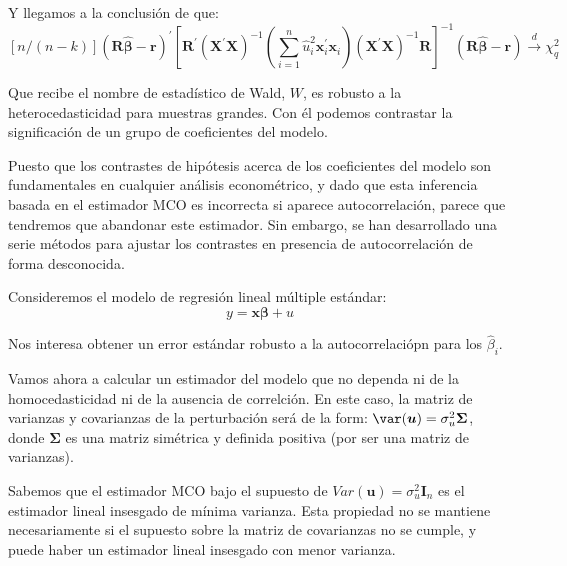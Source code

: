 Y llegamos a la conclusi\'on de que:
\[[n/(n-k)](\boldsymbol{R}\hat{\boldsymbol{\beta}}-\boldsymbol{r})^{\prime}\left[\boldsymbol{R}^{\prime}\left(\boldsymbol{X}^{\prime}\boldsymbol{X}\right)^{-1}\left(\sum_{i=1}^n\hat{u}_i^2\boldsymbol{x}_i^{\prime}\boldsymbol{x}_i\right)\left(\boldsymbol{X}^{\prime}\boldsymbol{X}\right)^{-1}\boldsymbol{R}\right]^{-1} (\boldsymbol{R}\hat{\boldsymbol{\beta}}-\boldsymbol{r})\overset{d}{\to}\chi^2_q \]

Que recibe el nombre de estad\'istico de Wald, $W$, es robusto a la heterocedasticidad para muestras grandes. Con \'el podemos contrastar la significaci\'on de un grupo de coeficientes del modelo.



Puesto que los contrastes de hip\'otesis acerca de los coeficientes del modelo son fundamentales en cualquier an\'alisis econom\'etrico, y dado que esta inferencia basada en el estimador MCO es incorrecta si aparece autocorrelaci\'on, parece que tendremos que abandonar este estimador. Sin embargo, se han desarrollado una serie m\'etodos para ajustar los contrastes en presencia de autocorrelaci\'on de forma desconocida.

Consideremos el modelo de regresi\'on lineal m\'ultiple est\'andar:
\[y=\boldsymbol{x}\boldsymbol{\beta}+u\]

Nos interesa obtener un error est\'andar robusto a la autocorrelaci\'opn para los $\hat{\beta}_i$. 




Vamos ahora a calcular un estimador del modelo que no dependa ni de la homocedasticidad ni de la ausencia de correlci\'on. En este caso, la matriz de varianzas y covarianzas de la perturbaci\'on ser\'a de la form: $\var(\boldsymbol{u})=\sigma_u^2\boldsymbol{\Sigma}$, donde $\boldsymbol{\Sigma}$ es una matriz sim\'etrica y definida positiva (por ser una matriz de varianzas).

Sabemos que el estimador MCO bajo el supuesto de $Var\left(\boldsymbol{u}\right)=\sigma_{u}^{2}\boldsymbol{I}_{n}$
es el estimador lineal insesgado de m\'inima varianza. Esta propiedad
no se mantiene necesariamente si el supuesto sobre la matriz de covarianzas
no se cumple, y puede haber un estimador lineal insesgado con menor
varianza.

